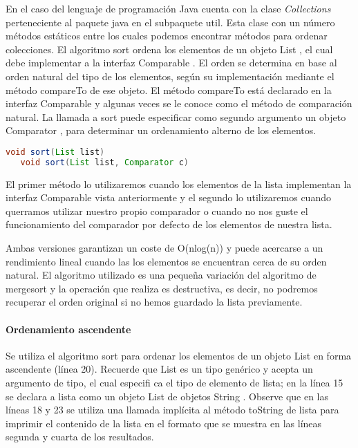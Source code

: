 En el caso del lenguaje de programación Java cuenta con la clase {\em Collections} perteneciente al paquete java en el subpaquete util. Esta clase con un número métodos estáticos entre los cuales podemos encontrar métodos para ordenar colecciones. El algoritmo sort ordena los elementos de un objeto List , el cual debe implementar a la interfaz Comparable . El orden se determina en base al orden natural del tipo de los elementos, según su implementación mediante el método compareTo de ese objeto. El método compareTo está declarado en la interfaz Comparable y algunas veces se le conoce como el método de comparación natural. La llamada a sort puede especificar como segundo argumento un objeto Comparator , para determinar un ordenamiento alterno de los elementos.

\begin{lstlisting}[language=Java]
   void sort(List list)
   void sort(List list, Comparator c)
\end{lstlisting}

El primer método lo utilizaremos cuando los elementos de la lista implementan la interfaz Comparable vista anteriormente y el segundo lo utilizaremos cuando querramos utilizar nuestro propio comparador o cuando no nos guste el funcionamiento del comparador por defecto de los elementos de nuestra lista.

Ambas versiones garantizan un coste de O(nlog(n)) y puede acercarse a un rendimiento lineal cuando las los elementos se encuentran cerca de su orden natural. El algoritmo utilizado es una pequeña variación del algoritmo de mergesort y la operación que realiza es destructiva, es decir, no podremos recuperar el orden original si no hemos guardado la lista previamente.

\paragraph{Ordenamiento ascendente}
Se utiliza el algoritmo sort para ordenar los elementos de un objeto List en forma ascendente
(línea 20). Recuerde que List es un tipo genérico y acepta un argumento de tipo, el cual especifi ca el tipo de
elemento de lista; en la línea 15 se declara a lista como un objeto List de objetos String . Observe que en las
líneas 18 y 23 se utiliza una llamada implícita al método toString de lista para imprimir el contenido de la
lista en el formato que se muestra en las líneas segunda y cuarta de los resultados.

